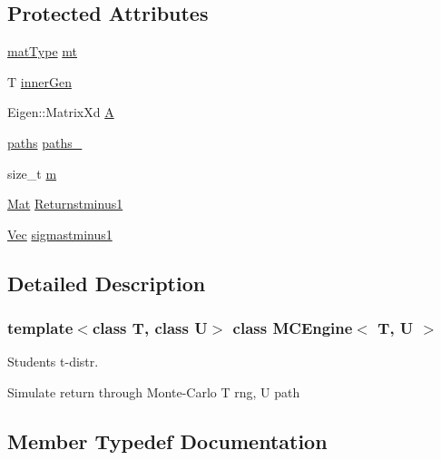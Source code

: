 \subsection*{Protected Attributes}
\begin{DoxyCompactItemize}
\item 
\hyperlink{mc__engine_8h_aac1fa89c4c60883790b2adb885048486}{mat\+Type} \hyperlink{classMCEngine_a66aed856c87b6ad40107b50e229da831}{mt}
\item 
T \hyperlink{classMCEngine_ae365d3f22ff95cdd7efbd9b555e81a3b}{inner\+Gen}
\item 
Eigen\+::\+Matrix\+Xd \hyperlink{classMCEngine_a916324fa45d5e3288e5792fc769c1ded}{A}
\item 
\hyperlink{classMCEngine_a977f1048508a1467c496c2c47231d1d3}{paths} \hyperlink{classMCEngine_a138035de4a3c8e088c437da6d6079ded}{paths\+\_\+}
\item 
size\+\_\+t \hyperlink{classMCEngine_a56d5cb47b251de9dd585af4ce6f32c18}{m}
\item 
\hyperlink{compute__returns__eigen_8h_ae14dd28696f743e067dbd2594616bad6}{Mat} \hyperlink{classMCEngine_a74547ec91afe270f4b0efc13048852dc}{Returnstminus1}
\item 
\hyperlink{compute__returns__eigen_8h_a1eb6a9306ef406d7975f3cbf2e247777}{Vec} \hyperlink{classMCEngine_afbebad3416f7c4eb6527497d19366f82}{sigmastminus1}
\end{DoxyCompactItemize}


\subsection{Detailed Description}
\subsubsection*{template$<$class T, class U$>$\newline
class M\+C\+Engine$<$ T, U $>$}

Student\textquotesingle{}s t-\/distr. 

Simulate return through Monte-\/\+Carlo T rng, U path 

\subsection{Member Typedef Documentation}
\hypertarget{classMCEngine_a977f1048508a1467c496c2c47231d1d3}{}\label{classMCEngine_a977f1048508a1467c496c2c47231d1d3} 
